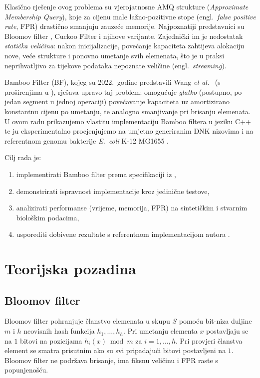 \documentclass[12pt,a4paper]{article}
\begin{document}
Klasično rješenje ovog problema su vjerojatnosne AMQ strukture
(\emph{Approximate Membership Query}), koje za cijenu male lažno-pozitivne stope (engl.\
\textit{false positive rate}, FPR) drastično smanjuju zauzeće memorije. Najpoznatiji
predstavnici su Bloomov filter \cite{bloom1970}, Cuckoo Filter \cite{fan2014cuckoo} i
njihove varijante. Zajednički im je nedostatak \emph{statička veličina}: nakon
inicijalizacije, povećanje kapaciteta zahtijeva alokaciju nove, veće strukture i
ponovno umetanje svih elemenata, što je u praksi neprihvatljivo za tijekove podataka
nepoznate veličine (engl.~\textit{streaming}).

Bamboo Filter (BF), kojeg su 2022.~godine predstavili Wang
\textit{et al.}~\cite{wang2022bamboo} (s proširenjima u \cite{wang2024bamboo}),
rješava upravo taj problem: omogućuje \emph{glatko} (postupno, po jedan segment u
jednoj operaciji) povećavanje kapaciteta uz amortizirano konstantnu cijenu po
umetanju, te analogno smanjivanje pri brisanju elemenata. U ovom radu prikazujemo
vlastitu implementaciju Bamboo filtera u jeziku C++ te ju eksperimentalno procjenjujemo
na umjetno generiranim DNK nizovima i na referentnom genomu bakterije
\textit{E.~coli} K-12 MG1655 \cite{ncbi-ecoli}.

Cilj rada je:
\begin{enumerate}
    \item implementirati Bamboo filter prema specifikaciji iz \cite{wang2022bamboo},
    \item demonstrirati ispravnost implementacije kroz jedinične testove,
    \item analizirati performanse (vrijeme, memorija, FPR) na sintetičkim i stvarnim
          biološkim podacima,
    \item usporediti dobivene rezultate s referentnom implementacijom autora
          \cite{wanghanchengchn-repo}.
\end{enumerate}

\section{Teorijska pozadina}
\label{sec:teorija}

\subsection{Bloomov filter}
Bloomov filter \cite{bloom1970} pohranjuje članstvo elemenata u skupu $S$ pomoću
bit-niza duljine $m$ i $h$ neovisnih hash funkcija $h_1, \ldots, h_h$.
Pri umetanju elementa $x$ postavljaju se na $1$ bitovi na pozicijama
$h_i(x) \bmod m$ za $i = 1, \ldots, h$. Pri provjeri članstva element se smatra
prisutnim ako su svi pripadajući bitovi postavljeni na $1$. Bloomov filter ne podržava
brisanje, ima fiksnu veličinu i FPR raste s popunjenošću.
\end{document}
